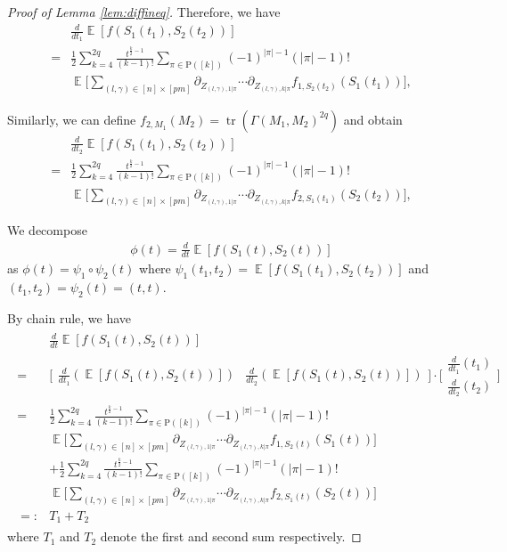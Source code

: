 \documentclass[11pt]{amsart}
\numberwithin{equation}{section}
\numberwithin{equation}{section}
\DeclareMathOperator{\E}{\mathbb{E}}
\DeclareMathOperator*{\tr}{tr}
\theoremstyle{remark}
\theoremstyle{definition}
\begin{document}
\begin{proof}[Proof of Lemma \ref{lem:diffineq}]
Therefore, we have
\begin{align*}
	&\frac{d}{dt_1}\E[f(S_1(t_1),S_2(t_2))] 
 \\=&
	\frac{1}{2}\sum_{k=4}^{2q}
	\frac{t^{\frac{k}{2}-1}}{(k-1)!}
	\sum_{\pi\in\mathrm{P}([k])}
	(-1)^{|\pi|-1}(|\pi|-1)!\,
	\\&\E\Bigg[ \sum_{(l,\gamma) \in [n] \times [pm]} \partial_{Z_{(l,\gamma),1|\pi}}\cdots\partial_{Z_{(l,\gamma),k|\pi}}f_{1,S_2(t_2)}(S_1(t_1))
	\Bigg],
\end{align*}

Similarly, we can define $f_{2,M_1}(M_2)=\tr(\Gamma(M_1,M_2)^{2q})$ and obtain
\begin{align*}
	&\frac{d}{dt_2}\E[f(S_1(t_1),S_2(t_2))] \\=& 
	\frac{1}{2}\sum_{k=4}^{2q}
	\frac{t^{\frac{k}{2}-1}}{(k-1)!}
	\sum_{\pi\in\mathrm{P}([k])}
	(-1)^{|\pi|-1}(|\pi|-1)!\,\\&
	\E\Bigg[ \sum_{(l,\gamma) \in [n] \times [pm]}\partial_{Z_{(l,\gamma),1|\pi}}\cdots\partial_{Z_{(l,\gamma),k|\pi}}f_{2,S_1(t_1)}(S_2(t_2))
	\Bigg],
\end{align*}

We decompose \begin{align*}\phi(t)=\frac{d}{dt} \E [f(S_1(t), S_2(t))]\end{align*} as $\phi(t)=\psi_1 \circ \psi_2(t)$ where
$\psi_1(t_1,t_2)=\E[f(S_1(t_1),S_2(t_2))]$
and $(t_1,t_2)=\psi_2(t)=(t,t)$.



By chain rule, we have
\begin{align}
\begin{split} \label{eq:derestdecoup} 
	&\frac{d}{dt}\E[f(S_1(t),S_2(t))]
 \\=&
 \Bigg[\begin{array}{cc}
    \frac{d}{dt_1}(\E[f(S_1(t),S_2(t))])  & \frac{d}{dt_2}(\E[f(S_1(t),S_2(t))]) 
 \end{array}\Bigg] \cdot \Bigg[\begin{array}{cc}
      \frac{d}{dt_1}(t_1)  \\ \frac{d}{dt_2}(t_2)
 \end{array}\Bigg]
 \\=& 	\frac{1}{2}\sum_{k=4}^{2q}
	\frac{t^{\frac{k}{2}-1}}{(k-1)!}
	\sum_{\pi\in\mathrm{P}([k])}
	(-1)^{|\pi|-1}(|\pi|-1)!\,
	\\&\E\Bigg[ \sum_{(l,\gamma) \in [n] \times [pm]} \partial_{Z_{(l,\gamma),1|\pi}}\cdots\partial_{Z_{(l,\gamma),k|\pi}}f_{1,S_2(t)}(S_1(t))
	\Bigg]\\&+\frac{1}{2}\sum_{k=4}^{2q}
	\frac{t^{\frac{k}{2}-1}}{(k-1)!}
	\sum_{\pi\in\mathrm{P}([k])}
	(-1)^{|\pi|-1}(|\pi|-1)!\,
	\\&\E\Bigg[ \sum_{(l,\gamma) \in [n] \times [pm]} \partial_{Z_{(l,\gamma),1|\pi}}\cdots\partial_{Z_{(l,\gamma),k|\pi}}f_{2,S_1(t)}(S_2(t))
	\Bigg]\\=:& T_1 + T_2
 \end{split}
\end{align}
where $T_1$ and $T_2$ denote the first and second sum respectively.


\end{proof}
\end{document}
